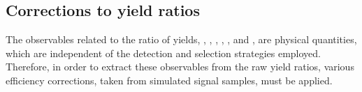 {\footnotesize
\begin{table}[h]
\caption{Detection asymmetry factors for each of the observables in the \CP fit.}
\label{detectionasymmetry}
\end{table}}

\subsection{Corrections to yield ratios}
\label{sec:cpfit:efficiencies}

The \CP observables related to the ratio of yields, \Rkk, \Rpipi, \Rptwo, \Rmtwo, \Rpipipipi, \Rpfour and \Rmfour, are physical quantities, which are independent of the detection and selection strategies employed. Therefore, in order to extract these \CP observables from the raw yield ratios, various efficiency corrections, taken from simulated signal samples, must be applied.

